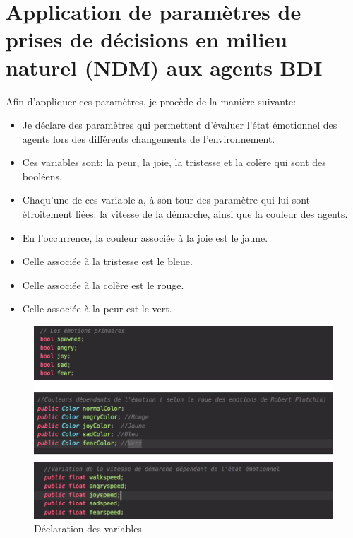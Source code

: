 \section{Application de paramètres de prises de décisions en milieu naturel (NDM) aux agents BDI}

Afin d’appliquer ces paramètres, je procède de la manière suivante: 

\begin{itemize}
\item Je déclare des paramètres qui permettent d’évaluer l’état émotionnel des agents lors des différents changements de l’environnement.
\item Ces variables sont: la peur, la joie, la tristesse et la colère qui sont des booléens.
\item Chaqu’une de ces variable a, à son tour des paramètre qui lui sont étroitement liées: la vitesse de la démarche, ainsi que la couleur des agents.
\item En l'occurrence, la couleur associée à la joie est le jaune.
\item Celle associée à la tristesse est le bleue.
\item Celle associée à la colère est le rouge.
\item Celle associée à la peur est le vert.
\end{itemize}

\begin{figure}[th]
\centering
\includegraphics{Figures/75unity.JPG}
\decoRule
\caption[Code Source]{Déclaration des variables}
\label{fig:75}
\end{figure}




